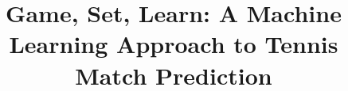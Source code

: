 \documentclass[conference]{IEEEtran}
\begin{document}
%
\title{Game, Set, Learn: A Machine Learning Approach to Tennis Match Prediction}


\author{
\and
{}
\and
{}}


% 
\end{document}
